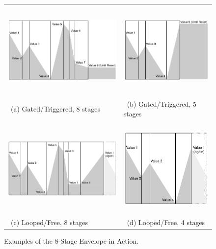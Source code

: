 \documentclass{article}
\begin{document}
\begin{figure}[t]
\begin{center}
\begin{tabular}{@{}ll@{}}
\includegraphics[height=1.9in]{OneShot.pdf}&
\includegraphics[height=1.9in]{OneShotShort.pdf}\\
~(a) Gated/Triggered, 8 stages&
~(b) Gated/Triggered, 5 stages\\\\
\includegraphics[height=1.9in]{Looped.pdf}&
\includegraphics[height=1.9in]{LoopedShort.pdf}\\
~(c) Looped/Free, 8 stages&
~(d) Looped/Free, 4 stages
\end{tabular}
\end{center}
\caption{Examples of the 8-Stage Envelope in Action.}
\end{figure}
\end{document}
